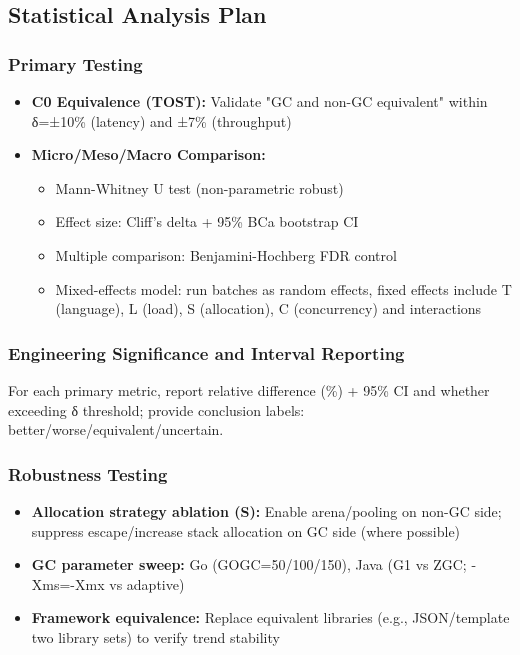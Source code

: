 \subsection{Statistical Analysis Plan}

\subsubsection{Primary Testing}
\begin{itemize}
    \item \textbf{C0 Equivalence (TOST):} Validate "GC and non-GC equivalent" within δ=±10\% (latency) and ±7\% (throughput)
    \item \textbf{Micro/Meso/Macro Comparison:}
    \begin{itemize}
        \item Mann-Whitney U test (non-parametric robust)
        \item Effect size: Cliff's delta + 95\% BCa bootstrap CI
        \item Multiple comparison: Benjamini-Hochberg FDR control
        \item Mixed-effects model: run batches as random effects, fixed effects include T (language), L (load), S (allocation), C (concurrency) and interactions
    \end{itemize}
\end{itemize}

\subsubsection{Engineering Significance and Interval Reporting}
For each primary metric, report relative difference (\%) + 95\% CI and whether exceeding δ threshold; provide conclusion labels: better/worse/equivalent/uncertain.

\subsubsection{Robustness Testing}
\begin{itemize}
    \item \textbf{Allocation strategy ablation (S):} Enable arena/pooling on non-GC side; suppress escape/increase stack allocation on GC side (where possible)
    \item \textbf{GC parameter sweep:} Go (GOGC=50/100/150), Java (G1 vs ZGC; -Xms=-Xmx vs adaptive)
    \item \textbf{Framework equivalence:} Replace equivalent libraries (e.g., JSON/template two library sets) to verify trend stability
\end{itemize}
